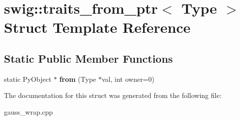 \hypertarget{structswig_1_1traits__from__ptr}{\section{swig\-:\-:traits\-\_\-from\-\_\-ptr$<$ Type $>$ Struct Template Reference}
\label{structswig_1_1traits__from__ptr}
}
\subsection*{Static Public Member Functions}
\begin{DoxyCompactItemize}
\item 
\hypertarget{structswig_1_1traits__from__ptr_a02f758f7fd32a799a85cf3509940ff02}{static Py\-Object $\ast$ {\bfseries from} (Type $\ast$val, int owner=0)}\label{structswig_1_1traits__from__ptr_a02f758f7fd32a799a85cf3509940ff02}

\end{DoxyCompactItemize}


The documentation for this struct was generated from the following file\-:\begin{DoxyCompactItemize}
\item 
gauss\-\_\-wrap.\-cpp\end{DoxyCompactItemize}

